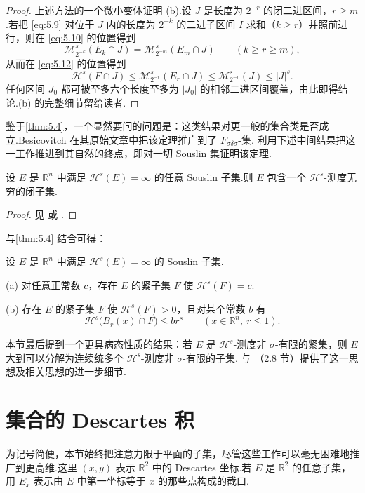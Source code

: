 \begin{proof}
上述方法的一个微小变体证明 (b).设 $J$ 是长度为 $2^{-r}$ 的闭二进区间，$r\geq m$.若把 \eqref{eq:5.9} 对位于 $J$ 内的长度为 $2^{-k}$ 的二进子区间 $I$ 求和（$k\geq r$）并照前进行，则在 \eqref{eq:5.10} 的位置得到
\[
  \mathcal{M}^{s}_{2^{-k}}(E_k\cap J)=\mathcal{M}^{s}_{2^{-m}}(E_m\cap J)\qquad(k\geq r\geq m),
\]
从而在 \eqref{eq:5.12} 的位置得到
\[
  \mathcal{H}^{s}(F\cap J)\leq\mathcal{M}^{s}_{2^{-r}}(E_r\cap J)\leq\mathcal{M}^{s}_{2^{-r}}(J)\leq|J|^{s}.
\]
任何区间 $J_0$ 都可被至多六个长度至多为 $|J_0|$ 的相邻二进区间覆盖，由此即得结论.(b) 的完整细节留给读者.
\end{proof}

鉴于\cref{thm:5.4}，一个显然要问的问题是：这类结果对更一般的集合类是否成立.Besicovitch 在其原始文章中把该定理推广到了 $F_{\sigma\delta\sigma}$-集.\textcite{davies1952b} 利用下述中间结果把这一工作推进到其自然的终点，即对一切 Souslin 集证明该定理.

\begin{theorem}\label{thm:5.5}
设 $E$ 是 $\mathbb{R}^n$ 中满足 $\mathcal{H}^s(E)=\infty$ 的任意 Souslin 子集.则 $E$ 包含一个 $\mathcal{H}^s$-测度无穷的闭子集.
\end{theorem}

\begin{proof}
见 \textcite{davies1952b} 或 \textcite{rogers1970}.
\end{proof}

与\cref{thm:5.4} 结合可得：

\begin{theorem}\label{thm:5.6}
设 $E$ 是 $\mathbb{R}^n$ 中满足 $\mathcal{H}^s(E)=\infty$ 的 Souslin 子集.

(a) 对任意正常数 $c$，存在 $E$ 的紧子集 $F$ 使 $\mathcal{H}^s(F)=c$.

(b) 存在 $E$ 的紧子集 $F$ 使 $\mathcal{H}^s(F)>0$，且对某个常数 $b$ 有
\[
  \mathcal{H}^{s}\bigl(B_r(x)\cap F\bigr)\leq br^{s}\qquad(x\in\mathbb{R}^n,\ r\leq 1).
\]
\end{theorem}

本节最后提到一个更具病态性质的结果：若 $E$ 是 $\mathcal{H}^s$-测度非 $\sigma$-有限的紧集，则 $E$ 大到可以分解为连续统多个 $\mathcal{H}^s$-测度非 $\sigma$-有限的子集.\textcite{davies1968} 与 \textcite{rogers1970}（2.8 节）提供了这一思想及相关思想的进一步细节.

\section{集合的 Descartes 积}

为记号简便，本节始终把注意力限于平面的子集，尽管这些工作可以毫无困难地推广到更高维.这里 $(x,y)$ 表示 $\mathbb{R}^2$ 中的 Descartes 坐标.若 $E$ 是 $\mathbb{R}^2$ 的任意子集，用 $E_x$ 表示由 $E$ 中第一坐标等于 $x$ 的那些点构成的截口.

